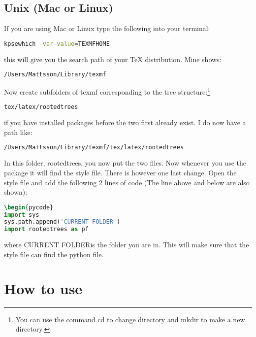 \documentclass[11pt,a4paper]{article}
\begin{document}
\subsection{Unix (Mac or Linux)}
If you are using Mac or Linux type the following into your terminal:
\begin{lstlisting}[language={bash}]
kpsewhich -var-value=TEXMFHOME
\end{lstlisting}
this will give you the search path of your TeX distribution. Mine shows:
\begin{lstlisting}[language={bash}]
/Users/Mattsson/Library/texmf
\end{lstlisting}
Now create subfolders of texmf corresponding to the tree structure:\footnote{You can use the command cd to change directory and mkdir to make a new directory. }
\begin{lstlisting}[language={bash}]
tex/latex/rootedtrees
\end{lstlisting}
if you have installed packages before the two first already exist. I do now have a path like:
\begin{lstlisting}[language={bash}]
/Users/Mattsson/Library/texmf/tex/latex/rootedtrees
\end{lstlisting}
In this folder, rootedtrees, you now put the two files. Now whenever you use the package it will find the style file. There is however one last change. Open the style file and add the following 2 lines of code (The line above and below are also shown):
\begin{lstlisting}[language={TeX}]
\begin{pycode}
import sys
sys.path.append('CURRENT FOLDER')
import rootedtrees as pf
\end{lstlisting}
where \glqq CURRENT FOLDER\grqq is the folder you are in. This will make sure that the style file can find the python file.

\newpage
\section{How to use}
\end{document}
